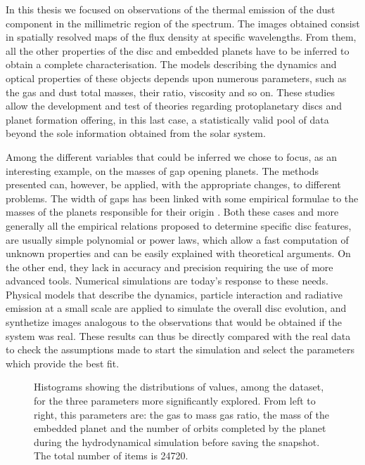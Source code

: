 \documentclass[a4paper,10pt, margin=1cm]{article}
\begin{document}
In this thesis we focused on observations of the thermal emission of the dust component in the
millimetric region of the spectrum. The images obtained consist in spatially resolved maps of
the flux density at specific wavelengths. From them,
all the other properties of the disc and embedded planets have to be inferred to 
obtain a complete characterisation. The models describing the dynamics and optical properties 
of these objects depends upon numerous parameters, such as the gas and dust total masses, their ratio, viscosity and so on.
These studies allow the development and test of theories
regarding protoplanetary discs and
planet formation offering, in this last case, a statistically valid pool of data beyond the sole information obtained from the solar system.

Among the different variables that could be inferred we chose to focus, as an interesting 
example, on the masses of gap opening planets. The methods presented can, however, be applied,
with the appropriate changes, to different problems. 
The width of gaps has been linked with some empirical formulae to the masses of the planets responsible for
their origin \citep{Lodato_2019,kanagawa}. Both these cases and more generally all the empirical relations 
proposed to determine specific disc features, are usually simple polynomial or power laws, which 
allow a fast computation of unknown properties and can be easily explained with theoretical
arguments. On the other end, they lack in accuracy and precision requiring the use of more advanced tools.
Numerical simulations are today's response to these needs. Physical models that describe the dynamics, 
particle interaction and radiative emission at a small scale are applied
to simulate the overall disc evolution, and synthetize images analogous to the observations that would be 
obtained if the system was real.
These results can thus be directly compared  with the real data
to check the assumptions made to start the simulation and 
select the parameters which provide the best fit. 

\begin{figure}
  \begin{center}
    \scalebox{0.8}{}
  \end{center}
  \caption{Histograms showing the distributions of values, among the dataset, for
  the three parameters more significantly explored. From left to right, this parameters are: the gas to mass gas ratio, 
  the mass of the embedded planet and the number of orbits completed by the planet during the hydrodynamical simulation
  before saving the snapshot. The total number of items is 24720.}
\end{figure}
\end{document}
